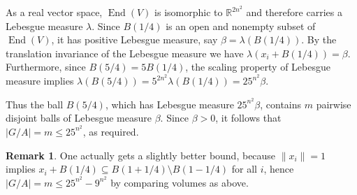 \documentclass[12pt]{amsart}
\theoremstyle{plain}
\theoremstyle{definition}
\newtheorem{remark}[theorem]{Remark}
\numberwithin{equation}{section}
\newcommand*{\abs}[1]{\lvert#1\rvert}
\newcommand*{\norm}[1]{\lVert#1\rVert}
\newcommand*{\RR}{\mathbb R}
\DeclareMathOperator{\End}{End}
\begin{document}
As a real vector space, $\End(V)$ is isomorphic to $\RR^{2n^2}$ and
therefore carries a Lebesgue measure $\lambda$. Since $B(1/4)$ is an
open and nonempty subset of $\End(V)$, it has positive Lebesgue
measure, say $\beta=\lambda(B(1/4))$. By the translation invariance of
the Lebesgue measure we have $\lambda(x_i+B(1/4))=\beta$. Furthermore,
since $B(5/4)=5B(1/4)$, the scaling property of Lebesgue measure
implies $\lambda(B(5/4))=5^{2n^2}\lambda(B(1/4))=25^{n^2}\beta$.

Thus the ball $B(5/4)$, which has Lebesgue measure $25^{n^2}\beta$,
contains $m$ pairwise disjoint balls of Lebesgue measure $\beta$.
Since $\beta>0$, it follows that $\abs{G/A}=m\le 25^{n^2}$, as
required.
\begin{remark}
  One actually gets a slightly better bound, because $\norm{x_i}=1$
  implies $x_i+B(1/4)\subseteq B(1+1/4)\setminus B(1-1/4)$ for all
  $i$, hence $\abs{G/A}=m\le 25^{n^2}-9^{n^2}$ by comparing volumes as
  above.
\end{remark}
\printbibliography
\end{document}
